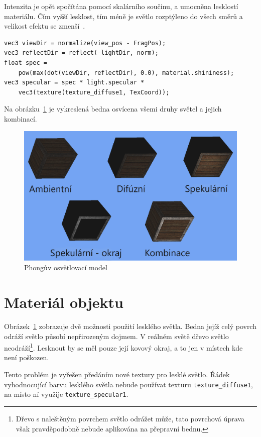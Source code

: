 \documentclass[thesis=M,czech]{FITthesis}[2019/12/23]
\begin{document}
Intenzita je opět spočítána pomocí skalárního součinu, a umocněna lesklostí materiálu. Čím vyšší lesklost, tím méně je světlo rozptýleno do všech směrů a velikost efektu se zmenší~\cite{lopgl_basic_light}.

\begin{verbatim}
vec3 viewDir = normalize(view_pos - FragPos);
vec3 reflectDir = reflect(-lightDir, norm);
float spec = 
    pow(max(dot(viewDir, reflectDir), 0.0), material.shininess);
vec3 specular = spec * light.specular * 
    vec3(texture(texture_diffuse1, TexCoord));
\end{verbatim}

Na obrázku~\ref{fig:phong} je vykreslená bedna osvícena všemi druhy světel a jejich kombinací.

\begin{figure}\centering
	\includegraphics[width=\textwidth]{images/phong_adj}
	\caption[Phongův osvětlovací model]{Phongův osvětlovací model}\label{fig:phong}
\end{figure}

\section{Materiál objektu}

Obrázek~\ref{fig:phong} zobrazuje dvě možnosti použití lesklého světla. Bedna jejíž celý povrch odráží světlo působí nepřirozeným dojmem. V reálném světě dřevo světlo neodráží\footnote{Dřevo s naleštěným povrchem světlo odrážet může, tato povrchová úprava však pravděpodobně nebude aplikována na přepravní bednu.}. Lesknout by se měl pouze její kovový okraj, a to jen v místech kde není poškozen.

Tento problém je vyřešen předáním nové textury pro lesklé světlo. Řádek vyhodnocující barvu lesklého světla nebude používat texturu \texttt{texture\_diffuse1}, na místo ní využije \texttt{texture\_specular1}.
\end{document}
